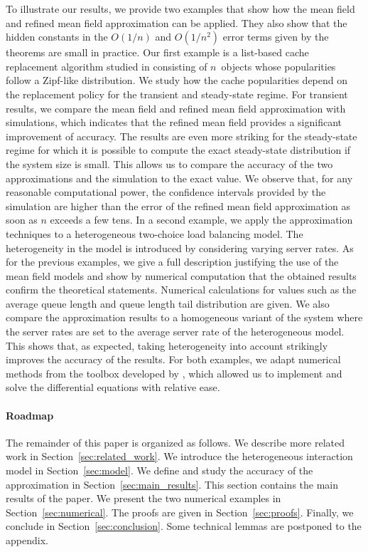 \documentclass[acmsmall]{acmart}
\begin{document}
To illustrate our results, we provide two examples that show how the mean field and refined mean field approximation can be applied. They also show that the hidden constants in the $O(1/n)$ and $O(1/n^2)$ error terms given by the theorems are small in practice. Our first example is a list-based cache replacement algorithm studied in \cite{gastTransientSteadystateRegime2015} consisting of $n$~objects whose popularities follow a Zipf-like distribution. We study how the cache popularities depend on the replacement policy for the transient and steady-state regime. For transient results, we compare the mean field and refined mean field approximation with simulations, which indicates that the refined mean field provides a significant improvement of accuracy. The results are even more striking for the steady-state regime for which it is possible to compute the exact steady-state distribution if the system size is small. This allows us to compare the accuracy of the two approximations and the simulation to the exact value. We observe that, for any reasonable computational power, the confidence intervals provided by the simulation are higher than the error of the refined mean field approximation as soon as $n$ exceeds a few tens. In a second example, we apply the approximation techniques to a heterogeneous two-choice load balancing model. The heterogeneity in the model is introduced by considering varying server rates. As for the previous examples, we give a full description justifying the use of the mean field models and show by numerical computation that the obtained results confirm the theoretical statements. Numerical calculations for values such as the average queue length and queue length tail distribution are given. We also compare the approximation results to a homogeneous variant of the system where the server rates are set to the average server rate of the heterogeneous model. This shows that, as expected, taking heterogeneity into account strikingly improves the accuracy of the results. For both examples, we adapt numerical methods from the toolbox developed by \cite{allmeier2021rmftool}, which allowed us to implement and solve the differential equations with relative ease. 


\paragraph*{Roadmap} The remainder of this paper is organized as follows. We describe more related work in Section~\ref{sec:related_work}. We introduce the heterogeneous interaction model in Section~\ref{sec:model}. We define and study the accuracy of the approximation in Section~\ref{sec:main_results}. This section contains the main results of the paper. We present the two numerical examples in Section~\ref{sec:numerical}. The proofs are given in Section~\ref{sec:proofs}. Finally, we conclude in Section~\ref{sec:conclusion}.  Some technical lemmas are postponed to the appendix.
\end{document}
